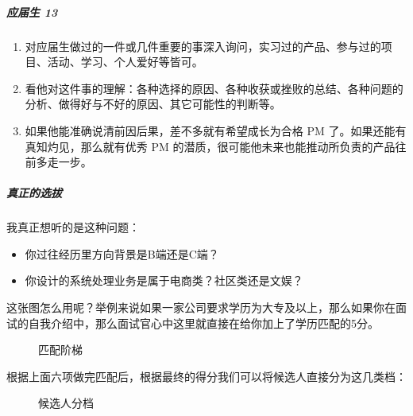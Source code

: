 \documentclass[letterpaper,10pt,english]{sphinxmanual}
\begin{document}
\subparagraph{应届生 13\sphinxfootnotemark[860]}
\label{\detokenize{chapter_interview/question:id7}}%
\begin{footnotetext}[860]\sphinxAtStartFootnote
{}
%
\end{footnotetext}\ignorespaces \begin{enumerate}
%
\item {} 
对应届生做过的一件或几件重要的事深入询问，实习过的产品、参与过的项目、活动、学习、个人爱好等皆可。

\item {} 
看他对这件事的理解：各种选择的原因、各种收获或挫败的总结、各种问题的分析、做得好与不好的原因、其它可能性的判断等。

\item {} 
如果他能准确说清前因后果，差不多就有希望成长为合格 PM
了。如果还能有真知灼见，那么就有优秀 PM
的潜质，很可能他未来也能推动所负责的产品往前多走一步。

\end{enumerate}


\subparagraph{真正的选拔}
\label{\detokenize{chapter_interview/question:id8}}
我真正想听的是这种问题：
\begin{itemize}
\item {} 
你过往经历里方向背景是B端还是C端？

\item {} 
你设计的系统处理业务是属于电商类？社区类还是文娱？

\end{itemize}

这张图怎么用呢？举例来说如果一家公司要求学历为大专及以上，那么如果你在面试的自我介绍中，那么面试官心中这里就直接在给你加上了学历匹配的5分。

\begin{figure}[H]
\centering
\capstart

\noindent{}
\caption{匹配阶梯}\label{\detokenize{chapter_interview/question:id19}}\end{figure}

根据上面六项做完匹配后，根据最终的得分我们可以将候选人直接分为这几类档：

\begin{figure}[H]
\centering
\capstart

\noindent{}
\caption{候选人分档}\label{\detokenize{chapter_interview/question:id20}}\end{figure}
\end{document}

